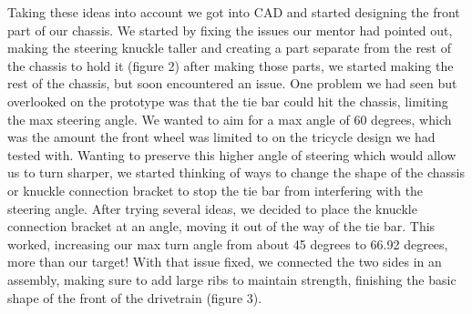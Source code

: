 Taking these ideas into account we got into CAD and started designing the front part of our chassis. We started by fixing the issues our mentor had pointed out,  making the steering knuckle taller and creating a part separate from the rest of the chassis to hold it (figure 2) after making those parts, we started making the rest of the chassis, but soon encountered an issue. One problem we had seen but overlooked on the prototype was that the tie bar could hit the chassis, limiting the max steering angle. We wanted to aim for a max angle of 60 degrees, which was the amount the front wheel was limited to on the tricycle design we had tested with. Wanting to preserve this higher angle of steering which would allow us to turn sharper, we started thinking of ways to change the shape of the chassis or knuckle connection bracket to stop the tie bar from interfering with the steering angle. After trying several ideas, we decided to place the knuckle connection bracket at an angle, moving it out of the way of the tie bar. This worked, increasing our max turn angle from about 45 degrees to 66.92 degrees, more than our target! With that issue fixed, we connected the two sides in an assembly, making sure to add large ribs to maintain strength, finishing the basic shape of the front of the drivetrain (figure 3).


 

